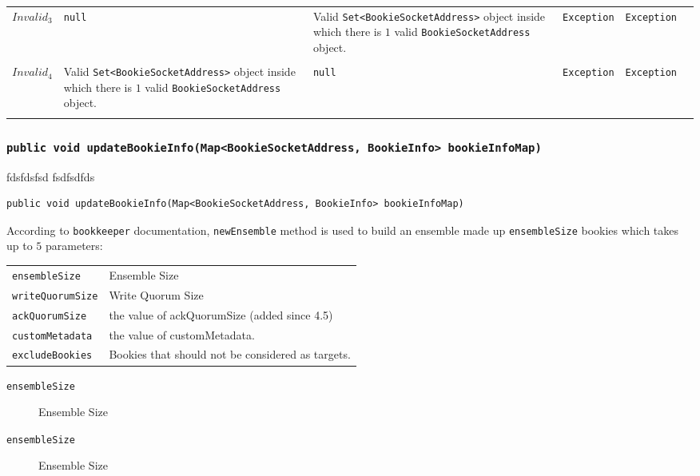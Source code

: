 \documentclass[conference, onecolumn]{IEEEtran}
\newcommand{\itemt}[1]{\item[\texttt{#1}]}
\begin{document}
\begin{table}[h!]
{\begin{tabular}{cp{5cm}p{5cm}p{5.5cm}p{5.5cm}c}
	$\textit{Invalid}_3$ & \texttt{null} & Valid \texttt{Set<BookieSocketAddress>} object inside which there is $1$ valid \texttt{BookieSocketAddress} object.  & \texttt{Exception} & \texttt{Exception}  & \ding{51} \\\\	
	
	$\textit{Invalid}_4$ & Valid \texttt{Set<BookieSocketAddress>} object inside which there is $1$ valid \texttt{BookieSocketAddress} object.  & \texttt{null} & \texttt{Exception} & \texttt{Exception}  & \ding{51} \\\\	
		
	
    \bottomrule
  \end{tabular}}
\end{table}


\subsubsection{\texttt{public void updateBookieInfo(Map<BookieSocketAddress, BookieInfo> bookieInfoMap)}}

fdsfdsfsd
fsdfsdfds


\begin{lstlisting}[frame=lines,caption={\texttt{onClusterChanged} method signature.},basicstyle=\fontsize{8}{9}\selectfont]
public void updateBookieInfo(Map<BookieSocketAddress, BookieInfo> bookieInfoMap)
\end{lstlisting}

According to \texttt{bookkeeper} documentation, \texttt{newEnsemble} method is used to build an ensemble made up \texttt{ensembleSize} bookies which takes up to $5$ parameters:
\begin{tabular}{ll}
  

\texttt{ensembleSize} & Ensemble Size \\
\texttt{writeQuorumSize} & Write Quorum Size \\
\texttt{ackQuorumSize} & the value of ackQuorumSize (added since 4.5) \\
\texttt{customMetadata} & the value of customMetadata. \\
\texttt{excludeBookies} & Bookies that should not be considered as targets. \\

\end{tabular}



\begin{description}
\item[\texttt{ensembleSize}] Ensemble Size
\itemt{ensembleSize} Ensemble Size
 
\end{description}
\end{document}
